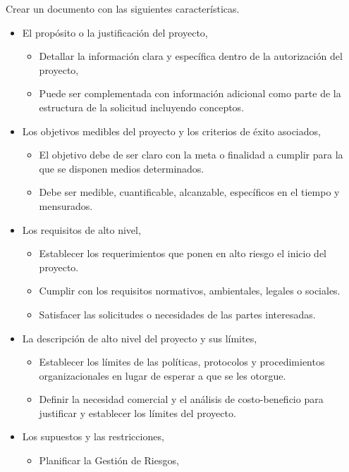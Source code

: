 \documentclass[letterpaper,12pt,openright,oneside]{article}
\theoremstyle{plain}
\begin{document}
Crear un documento con las siguientes características.

\begin{itemize}
    \item El propósito o la justificación del proyecto, 
        \begin{itemize}
            \item Detallar la información clara y específica dentro de la autorización del proyecto, 
            \item Puede ser complementada con información adicional como parte de la estructura de la solicitud incluyendo conceptos.
        \end{itemize}
    \item Los objetivos medibles del proyecto y los criterios de éxito asociados,
        \begin{itemize}
            \item El objetivo debe de ser claro con la meta o finalidad a cumplir para la que se disponen medios determinados.
            \item Debe ser medible, cuantificable, alcanzable, específicos en el tiempo y mensurados.
        \end{itemize}
    \item Los requisitos de alto nivel,
        \begin{itemize}
            \item Establecer los requerimientos que ponen en alto riesgo el inicio del proyecto.
            \item Cumplir con los requisitos normativos, ambientales, legales o sociales.
            \item Satisfacer las solicitudes o necesidades de las partes interesadas.
        \end{itemize}
    \item La descripción de alto nivel del proyecto y sus límites,
        \begin{itemize}
            \item Establecer los límites de las políticas, protocolos y procedimientos organizacionales en lugar de esperar a que se les otorgue.
            \item Definir la necesidad comercial y el análisis de costo-beneficio para justificar y establecer los límites del proyecto.
        \end{itemize}
    \item Los supuestos y las restricciones,
        \begin{itemize}
            \item Planificar la Gestión de Riesgos,

\end{itemize}
\end{itemize}
\end{document}
